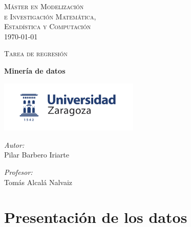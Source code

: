 \documentclass[a4paper,12pt]{article}
\author{Pilar Barbero Iriarte}
\begin{document}



\begin{titlepage}
\begin{center}



\textsc{\LARGE M\'aster en Modelizaci\'on \\e Investigaci\'on Matem\'atica,\\ Estad\'istica y Computaci\'on }\\[1.5cm]
{\large \today}

\textsc{Tarea de regresi\'on}\\[0.5cm]

\vfill

{ \huge \bfseries Miner\'ia de datos \\[0.4cm] }
\vfill

\includegraphics[width=0.5\textwidth]{logoUZ.png}~\\[1cm]

\noindent
\begin{minipage}{0.4\textwidth}
\begin{flushleft} \large
\emph{Autor:}\\
Pilar Barbero Iriarte
\end{flushleft}
\end{minipage}%
\begin{minipage}{0.4\textwidth}
\begin{flushright} \large
\emph{Profesor:} \\
Tom\'as Alcal\'a Nalvaiz
\end{flushright}
\end{minipage}

\end{center}


\end{titlepage}

\pagebreak
\tableofcontents
\pagebreak


\section{Presentaci\'on de los datos}
\end{document}
